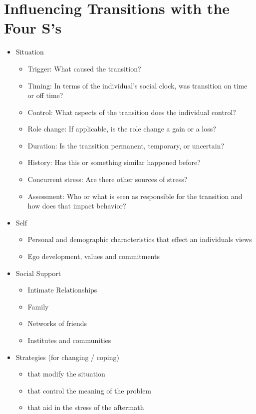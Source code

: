 \documentclass{article}
\begin{document}
\section{Influencing Transitions with the Four S's}
\begin{itemize}
  \item Situation
    \begin{itemize}
      \item Trigger: What caused the transition?
      \item Timing: In terms of the individual's social clock, was transition on time or off time?
      \item Control: What aspects of the transition does the individual control?
      \item Role change: If applicable, is the role change a gain or a loss?
      \item Duration: Is the transition permanent, temporary, or uncertain?
      \item History: Has this or something similar happened before?
      \item Concurrent stress: Are there other sources of stress?
      \item Assessment: Who or what is seen as responsible for the transition and how does that impact behavior?
    \end{itemize}
  \item Self
    \begin{itemize}
      \item Personal and demographic characteristics that effect an individuals views
      \item Ego development, values and commitments
    \end{itemize}
  \item Social Support
    \begin{itemize}
      \item Intimate Relationships
      \item Family
      \item Networks of friends
      \item Institutes and communities
    \end{itemize}
  \item Strategies (for changing / coping)
    \begin{itemize}
      \item that modify the situation
      \item that control the meaning of the problem
      \item that aid in the stress of the aftermath
    \end{itemize}
\end{itemize}
\end{document}
